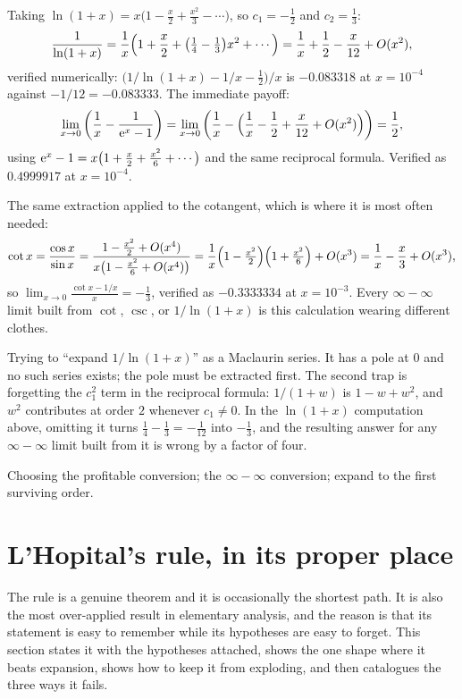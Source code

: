 \begin{worked}
Taking $\ln(1+x)=x\bigl(1-\tfrac{x}{2}+\tfrac{x^{2}}{3}-\cdots\bigr)$, so $c_1=-\tfrac12$ and $c_2=\tfrac13$:
\[
\frac{1}{\ln(1+x)}=\frac1x\Bigl(1+\frac{x}{2}+\bigl(\tfrac14-\tfrac13\bigr)x^{2}+\cdots\Bigr)=\frac1x+\frac12-\frac{x}{12}+O(x^{2}),
\]
verified numerically: $\bigl(1/\ln(1+x)-1/x-\tfrac12\bigr)/x$ is $-0.083318$ at $x=10^{-4}$ against $-1/12=-0.083333$. The immediate payoff:
\[
\lim_{x\to0}\left(\frac1x-\frac{1}{\mathrm{e}^{x}-1}\right)
=\lim_{x\to0}\left(\frac1x-\Bigl(\frac1x-\frac12+\frac{x}{12}+O(x^{2})\Bigr)\right)=\frac12 ,
\]
using $\mathrm{e}^{x}-1=x\bigl(1+\tfrac{x}{2}+\tfrac{x^{2}}{6}+\cdots\bigr)$ and the same reciprocal formula. Verified as $0.4999917$ at $x=10^{-4}$.

The same extraction applied to the cotangent, which is where it is most often needed:
\[
\cot x=\frac{\cos x}{\sin x}=\frac{1-\tfrac{x^{2}}{2}+O(x^{4})}{x\bigl(1-\tfrac{x^{2}}{6}+O(x^{4})\bigr)}
=\frac1x\Bigl(1-\tfrac{x^{2}}{2}\Bigr)\Bigl(1+\tfrac{x^{2}}{6}\Bigr)+O(x^{3})=\frac1x-\frac{x}{3}+O(x^{3}),
\]
so $\displaystyle\lim_{x\to0}\frac{\cot x-1/x}{x}=-\frac13$, verified as $-0.3333334$ at $x=10^{-3}$. Every $\infty-\infty$ limit built from $\cot$, $\csc$, or $1/\ln(1+x)$ is this calculation wearing different clothes.
\end{worked}

\begin{trap}
Trying to ``expand $1/\ln(1+x)$'' as a Maclaurin series. It has a pole at $0$ and no such series exists; the pole must be extracted first. The second trap is forgetting the $c_1^{2}$ term in the reciprocal formula: $1/(1+w)$ is $1-w+w^{2}$, and $w^{2}$ contributes at order $2$ whenever $c_1\neq0$. In the $\ln(1+x)$ computation above, omitting it turns $\tfrac14-\tfrac13=-\tfrac1{12}$ into $-\tfrac13$, and the resulting answer for any $\infty-\infty$ limit built from it is wrong by a factor of four.
\end{trap}

\begin{seealsob}Choosing the profitable conversion; the $\infty-\infty$ conversion; expand to the first surviving order.\end{seealsob}

\section{L'Hopital's rule, in its proper place}

The rule is a genuine theorem and it is occasionally the shortest path. It is also the most over-applied result in elementary analysis, and the reason is that its statement is easy to remember while its hypotheses are easy to forget. This section states it with the hypotheses attached, shows the one shape where it beats expansion, shows how to keep it from exploding, and then catalogues the three ways it fails.

